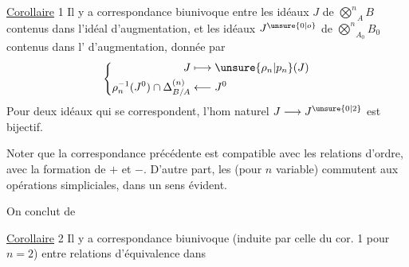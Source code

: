 \uline{Corollaire} 1 \quad Il y a correspondance biunivoque entre les idéaux $J$ de $\overset n{\bigotimes}_A B$ contenus dans l'idéal d'augmentation, et les idéaux $J^{\unsure{0|o}}$ de $\overset n{\bigotimes}_{A_0}B_0$ contenus dans l' d'augmentation, donnée par
\[
\left\{\begin{aligned}
J&\longmapsto\unsure{\rho_n|p_n}(J)\\
\rho_n^{-1}(J^0)\cap\Delta_{B/A}^{(n)}&\longleftarrow J^0
\end{aligned}\right.
\]
Pour deux idéaux  qui se correspondent, l'hom naturel $J\longrightarrow J^{\unsure{0|2}}$ est bijectif.

Noter que la correspondance précédente est compatible avec les relations d'ordre,   avec la formation de $+$ et $-$. D'autre part, les   (pour $n$ variable) commutent aux opérations simpliciales, dans un sens évident. 

On conclut de  

\uline{Corollaire} 2 \quad {} Il y a correspondance biunivoque (induite par celle du cor. 1 pour $n=2$) entre relations d'équivalence dans
